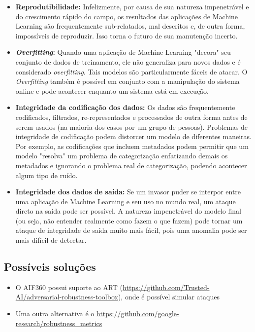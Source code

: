 \documentclass[portugues, 12pt, a4paper]{article}
\begin{document}
\begin{itemize}
\item \textbf{Reprodutibilidade:} Infelizmente, por causa de sua natureza impenetrável e do crescimento rápido do campo, os resultados das aplicações de Machine Learning são frequentemente sub-relatados, mal descritos e, de outra forma, impossíveis de reproduzir. Isso torna o futuro de sua manutenção incerto.

\item \textbf{\textit{Overfitting}:} Quando uma aplicação de Machine Learning "decora" seu conjunto de dados de treinamento, ele não generaliza para novos dados e é considerado \textit{overfitting}. Tais modelos são particularmente fáceis de atacar. O \textit{Overfitting} também é possível em conjunto com a manipulação do sistema online e pode acontecer enquanto um sistema está em execução.

\item \textbf{Integridade da codificação dos dados:} Os dados são frequentemente codificados, filtrados, re-representados e processados de outra forma antes de serem usados (na maioria dos casos por um grupo de pessoas). Problemas de integridade de codificação podem distorcer um modelo de diferentes maneiras. Por exemplo, as codificações que incluem metadados podem permitir que um modelo "resolva" um problema de categorização enfatizando demais os metadados e ignorando o problema real de categorização, podendo acontecer algum tipo de ruído.

\item \textbf{Integridade dos dados de saída:} Se um invasor puder se interpor entre uma aplicação de Machine Learning e seu uso no mundo real, um ataque direto na saída pode ser possível. A natureza impenetrável do modelo final (ou seja, não entender realmente como fazem o que fazem) pode tornar um ataque de integridade de saída muito mais fácil, pois uma anomalia pode ser mais difícil de detectar.
\end{itemize}


\subsection{Possíveis soluções}

\begin{itemize}

\item O AIF360 possui suporte ao ART (\url{https://github.com/Trusted-AI/adversarial-robustness-toolbox}), onde é possível simular ataques

\item Uma outra alternativa é o \url{https://github.com/google-research/robustness_metrics}

\end{itemize}
\end{document}
